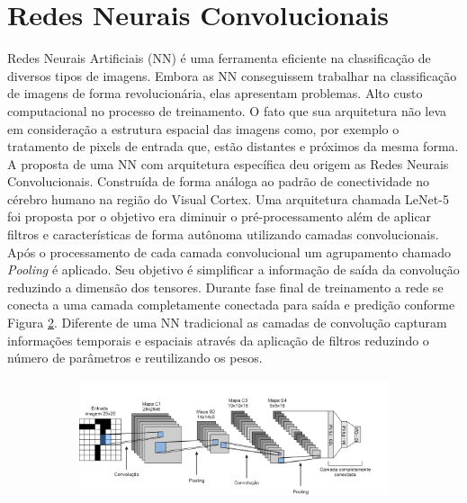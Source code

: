 \documentclass[12pt]{article}
\begin{document}
\section{Redes Neurais Convolucionais}
Redes Neurais Artificiais (NN) é uma ferramenta eficiente na classificação de diversos tipos de imagens. Embora as NN conseguissem trabalhar na classificação de imagens de forma revolucionária, elas apresentam problemas. Alto custo computacional no processo de treinamento. O fato que sua arquitetura não leva em consideração a estrutura espacial das imagens como, por exemplo o tratamento de pixels de entrada que, estão distantes e próximos da mesma forma. A proposta de uma NN com arquitetura específica deu origem as Redes Neurais Convolucionais. Construída de forma análoga ao padrão de conectividade no cérebro humano na região do Visual Cortex. Uma arquitetura chamada LeNet-5 foi proposta por \cite{LecunY} o objetivo era diminuir o pré-processamento além de aplicar filtros e características de forma autônoma utilizando camadas convolucionais. Após o processamento de cada camada convolucional um agrupamento chamado \textit{Pooling} é aplicado. Seu objetivo é simplificar a informação de saída da convolução reduzindo a dimensão dos tensores. Durante fase final de treinamento a rede se conecta a uma camada completamente conectada para saída e predição conforme Figura \ref{fig:lenet}. Diferente de uma NN tradicional as camadas de convolução capturam informações temporais e espaciais através da aplicação de filtros reduzindo o número de parâmetros e reutilizando os pesos. 

\begin{figure}[t]
\centering
\caption{Modelo da rede neural convolucional LeNet.}
\begin{subfigure}[t]{1\textwidth}
  \centering
  \includegraphics[width=1\linewidth]{images/lenet-3.png}
  \label{fig:lenet1}
\end{subfigure}
\label{fig:lenet}
\end{figure}
\end{document}
